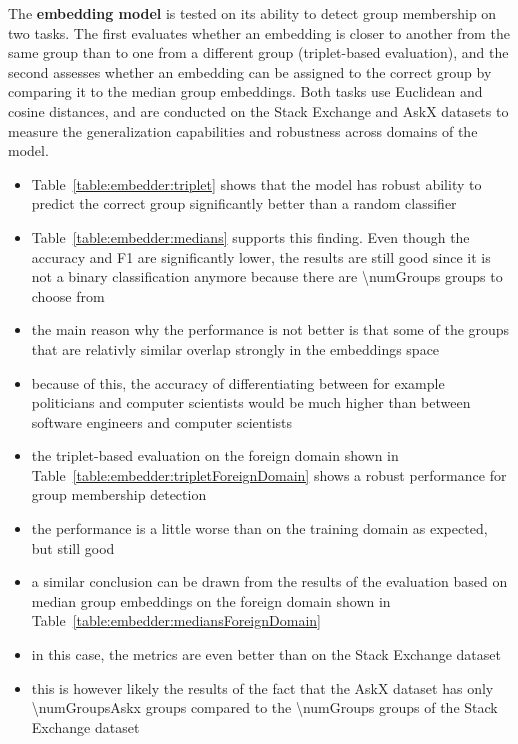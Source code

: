 The \textbf{embedding model} is tested on its ability to detect group membership on two tasks. The first evaluates whether an embedding is closer to another from the same group than to one from a different group (triplet-based evaluation), and the second assesses whether an embedding can be assigned to the correct group by comparing it to the median group embeddings. Both tasks use Euclidean and cosine distances, and are conducted on the Stack Exchange and AskX datasets to measure the generalization capabilities and robustness across domains of the model.

\begin{itemize}
  \item Table~\ref{table:embedder:triplet} shows that the model has robust ability to predict the correct group significantly better than a random classifier
  \item Table~\ref{table:embedder:medians} supports this finding. Even though the accuracy and F1 are significantly lower, the results are still good since it is not a binary classification anymore because there are \num{\numGroups} groups to choose from
  \item the main reason why the performance is not better is that some of the groups that are relativly similar overlap strongly in the embeddings space
  \item because of this, the accuracy of differentiating between for example politicians and computer scientists would be much higher than between software engineers and computer scientists

  \item the triplet-based evaluation on the foreign domain shown in Table~\ref{table:embedder:tripletForeignDomain} shows a robust performance for group membership detection
  \item the performance is a little worse than on the training domain as expected, but still good
  \item a similar conclusion can be drawn from the results of the evaluation based on median group embeddings on the foreign domain shown in Table~\ref{table:embedder:mediansForeignDomain}
  \item in this case, the metrics are even better than on the Stack Exchange dataset
  \item this is however likely the results of the fact that the AskX dataset has only \num{\numGroupsAskx} groups compared to the \num{\numGroups} groups of the Stack Exchange dataset
\end{itemize}

